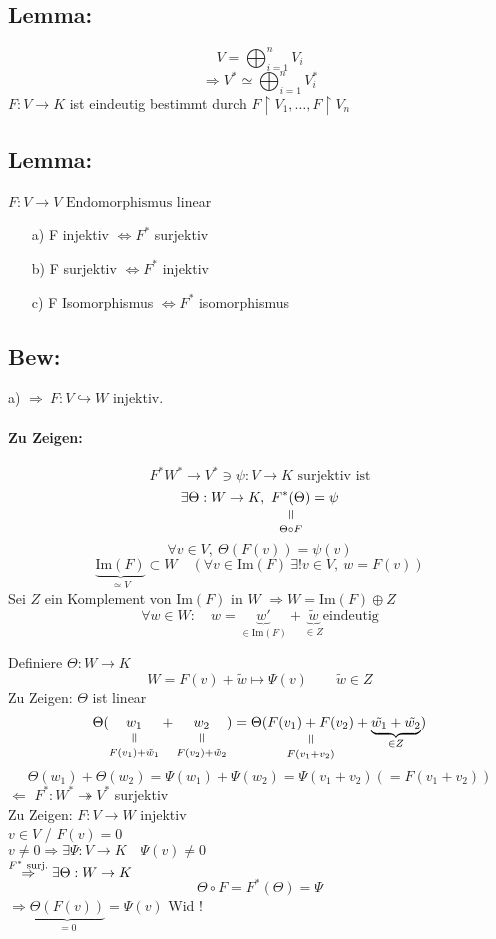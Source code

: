 \documentclass[titlepage,12pt,a4paper,ngerman]{report}
\newcommand{\verteq}{\rotatebox{90}{$\,=$}}
\newcommand{\equalto}[2]{\underset{\scriptstyle\overset{\mkern4mu\verteq}{#2}}{#1}}
\newcommand{\tx}[1]{\textrm{#1}}
\newcommand{\ub}[1]{\underbrace{#1}}
\newcommand{\enph}{F: V \to V \textrm{ Endomorphismus}}
\begin{document}
\subsection{Lemma:}
$$ V = \bigoplus_{i = 1}^{n} V_i$$
$$ \Rightarrow V^* \simeq \bigoplus_{i=1}^{n} V_i^*$$
$ F: V \to K $ ist eindeutig bestimmt durch $ F \upharpoonright V_1, \dots , F \upharpoonright V_n $
\subsection{Lemma:}
$ \enph $ linear
\begin{itemize}
	\item[a)] F injektiv $ \Leftrightarrow F^* $ surjektiv
	\item[b)] F surjektiv $ \Leftrightarrow F^* $ injektiv
	\item[c)] F Isomorphismus $ \Leftrightarrow F^* $ isomorphismus
\end{itemize}

\subsection{Bew:}
a) $\boxed{\Rightarrow}\ F: V \hookrightarrow W$ injektiv.
\paragraph{Zu Zeigen:} $$F^* W^* \to V^* \ni \psi: V \to K \tx{ surjektiv ist}$$
$$\exists \Theta: W \to K,\ \equalto{F^* (\Theta)}{\Theta \circ F} = \psi$$
$$\forall v \in V,\ \Theta(F(v)) = \psi(v)$$
$$\underbrace{\tx{Im}(F)}_{\simeq V} \subset W \quad (\forall v \in \tx{Im}(F)\ \exists ! v \in V,\ w = F(v))$$
Sei $Z$ ein Komplement von Im$(F)$ in $W$ $\Rightarrow W=$Im$(F) \oplus Z$
$$\forall w \in W: \quad w= \underbrace{w'}_{\in \tx{Im}(F)} + \underbrace{\tilde w}_{\in Z} \tx{eindeutig}$$

Definiere $ \Theta: W \to K $\\
$$ W = F(v) + \tilde{w} \mapsto \Psi(v) \qquad \tilde{w} \in Z$$
Zu Zeigen: $\Theta$ ist linear
$$\Theta(\equalto{w_1}{F(v_1) + \tilde{w}_1} + \equalto{w_2}{F(v_2) + \tilde{w}_2})= \Theta (\equalto{F(v_1) + F(v_2)}{F(v_1+v_2)} + \ub{\tilde{w_1} + \tilde{w_2}}_{\in Z})$$
$$ \Theta(w_1) + \Theta(w_2) = \Psi(w_1) + \Psi(w_2) = \Psi(v_1+v_2) (= F(v_1 + v_2))$$
$\boxed{\Leftarrow}$ $ F^* : W^* \twoheadrightarrow V^* $ surjektiv\\
Zu Zeigen: $ F: V \to W $ injektiv\\
$ v \in V $ / $ F(v) = 0 $\\
$  v \neq 0 \Rightarrow  \exists \Psi:V \to K \quad \Psi(v) \neq 0 $\\
$ \buildrel F^* \tx{ surj.} \over \Rightarrow \exists \Theta : W \to K $
$$ \Theta \circ F = F^*(\Theta) = \Psi $$
$ \Rightarrow \ub{\Theta(F(v))}_{=0} = \Psi(v) $ Wid !
\end{document}
